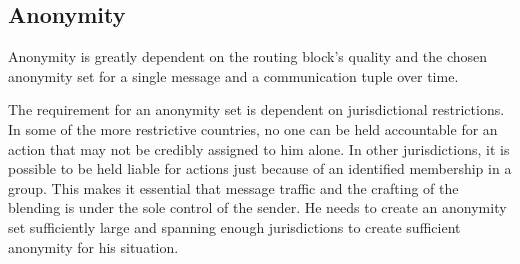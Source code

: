 \subsection{Anonymity}
Anonymity is greatly dependent on the routing block's quality and the chosen anonymity set for a single message and a communication tuple over time. 

The requirement for an anonymity set is dependent on jurisdictional restrictions. In some of the more restrictive countries, no one can be held accountable for an action that may not be credibly assigned to him alone. In other jurisdictions, it is possible to be held liable for actions just because of an identified membership in a group. This makes it essential that message traffic and the crafting of the blending is under the sole control of the sender. He needs to create an anonymity set sufficiently large and spanning enough jurisdictions to create sufficient anonymity for his situation.
